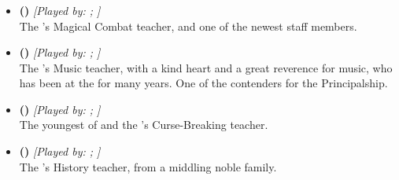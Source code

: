 \documentclass[blue]{GL2020}
\begin{document}
\subsubsection*{\pFarm{}}
\begin{itemize}
	\item \textbf{\cInterpol{\full} (\cInterpol{\MYCharpronouns})} \textit{[Played by: \cInterpol{\MYplayer}; \cInterpol{\MYPlaypronouns}]}\\ The \pSc{}'s Magical Combat teacher, and one of the newest staff members.
	
	\item \textbf{\cMusic{\full} (\cMusic{\MYCharpronouns})} \textit{[Played by: \cMusic{\MYplayer}; \cMusic{\MYPlaypronouns}]}\\ The \pSc{}'s Music teacher, with a kind heart and a great reverence for music, who has been at the \pSc{} for many years. One of the contenders for the Principalship.
	
	\item \textbf{\cPrince{\full} (\cPrince{\MYCharpronouns})} \textit{[Played by: \cPrince{\MYplayer}; \cPrince{\MYPlaypronouns}]}\\ The youngest \cPrince{\child} of \cQueen{\full} and the \pSc{}'s Curse-Breaking teacher.
			
	\item \textbf{\cHistory{\full} (\cHistory{\MYCharpronouns})} \textit{[Played by: \cHistory{\MYplayer}; \cHistory{\MYPlaypronouns}]}\\ The \pSc{}'s History teacher, from a middling noble family.
\end{itemize}
\end{document}
